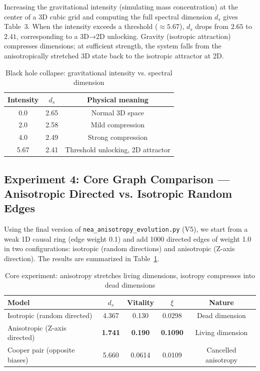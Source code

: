 \documentclass[12pt,a4paper]{article}
\begin{document}
Increasing the gravitational intensity (simulating mass concentration) at the center of a 3D cubic grid and computing the full spectral dimension $d_s$ gives Table~3. When the intensity exceeds a threshold ($\approx5.67$), $d_s$ drops from $2.65$ to $2.41$, corresponding to a 3D→2D unlocking. Gravity (isotropic attraction) compresses dimensions; at sufficient strength, the system falls from the anisotropically stretched 3D state back to the isotropic attractor at 2D.

\begin{table}[H]
\centering
\caption{Black hole collapse: gravitational intensity vs. spectral dimension}
\begin{tabular}{ccc}
\toprule
Intensity & $d_s$ & Physical meaning \\
\midrule
0.0 & 2.65 & Normal 3D space \\
2.0 & 2.58 & Mild compression \\
4.0 & 2.49 & Strong compression \\
5.67 & 2.41 & Threshold unlocking, 2D attractor \\
\bottomrule
\end{tabular}
\end{table}

\subsection{Experiment 4: Core Graph Comparison — Anisotropic Directed vs. Isotropic Random Edges}

Using the final version of \texttt{nea\_anisotropy\_evolution.py} (V5), we start from a weak 1D causal ring (edge weight 0.1) and add 1000 directed edges of weight 1.0 in two configurations: isotropic (random directions) and anisotropic (Z-axis direction). The results are summarized in Table~\ref{tab:core}.

\begin{table}[H]
	\centering
	\caption{Core experiment: anisotropy stretches living dimensions, isotropy compresses into dead dimensions}
	\label{tab:core}
	\begin{tabular}{lcccc}
		\toprule
		Model & $d_s$ & Vitality & $\xi$ & Nature \\
		\midrule
		Isotropic (random directed) & 4.367 & 0.130 & 0.0298 & Dead dimension \\
		Anisotropic (Z-axis directed) & \textbf{1.741} & \textbf{0.190} & \textbf{0.1090} & Living dimension \\
		Cooper pair (opposite biases) & 5.660 & 0.0614 & 0.0109 & Cancelled anisotropy \\
		\bottomrule
	\end{tabular}
\end{table}
\end{document}
